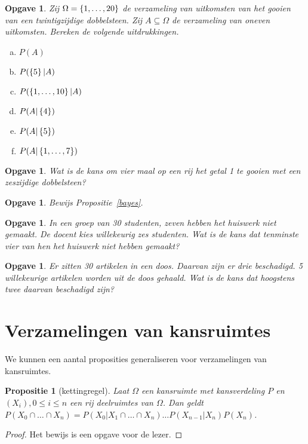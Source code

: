 \documentclass[a4paper]{book}
\newtheorem{proposition}[theorem]{Propositie}
\newtheorem{exercise}[theorem]{Opgave}
\theoremstyle{definition}
\begin{document}
\begin{exercise}
    Zij $\Omega = \set{1,\dots,20}$ de verzameling van uitkomsten van het gooien van een twintigzijdige dobbelsteen.
    Zij $A \subseteq \Omega$ de verzameling van oneven uitkomsten.
    Bereken de volgende uitdrukkingen.
    \begin{enumerate}[a.]
        \item $P(A)$
        \item $P(\set{5}|A)$
        \item $P(\set{1,\dots,10}|A)$
        \item $P(A|\set{4})$
        \item $P(A|\set{5})$
        \item $P(A|\set{1,\dots,7})$
    \end{enumerate}
\end{exercise}

\begin{exercise}
Wat is de kans om vier maal op een rij het getal 1 te gooien met een zeszijdige dobbelsteen?
\end{exercise}

\begin{exercise}
    Bewijs Propositie~\ref{bayes}.
\end{exercise}

\begin{exercise}
In een groep van 30 studenten, zeven hebben het huiswerk niet gemaakt. De docent kies willekeurig zes studenten.
Wat is de kans dat tenminste vier van hen het huiswerk niet hebben gemaakt?
\end{exercise}

\begin{exercise}
Er zitten 30 artikelen in een doos. Daarvan zijn er drie beschadigd.
5 willekeurige artikelen worden uit de doos gehaald. Wat is de kans dat hoogstens twee daarvan beschadigd zijn?
\end{exercise}


\section{Verzamelingen van kansruimtes}
We kunnen een aantal proposities generaliseren voor verzamelingen van kansruimtes.

\begin{proposition}[kettingregel]
    Laat $\Omega$ een kansruimte met kansverdeling $P$ en $(X_i), 0 \leq i \leq n$ een rij deelruimtes van $\Omega$.
    Dan geldt $P(X_0 \cap \dots \cap X_n) = P(X_0|X_1 \cap \dots \cap X_n) \dots P(X_{n-1}|X_n)P(X_n)$.
\end{proposition}
\begin{proof}
    Het bewijs is een opgave voor de lezer.
\end{proof}
\end{document}
